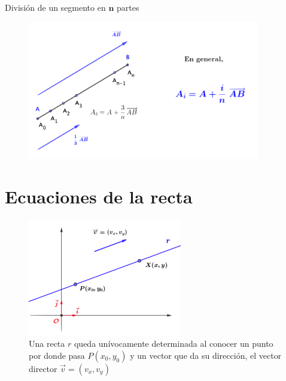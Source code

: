 \vspace{10mm}
\begin{myalertblock}{División de un segmento en $\boldsymbol n$ partes}

\begin{figure}[H]
	\centering
	\includegraphics[width=0.9\textwidth]{img-ga/ga11.png}
\end{figure}
	
\end{myalertblock}


\vspace{1cm}
\section{Ecuaciones de la recta}
\vspace{0.5cm}

\begin{figure}[H]
	\centering
	\includegraphics[width=0.6\textwidth]{img-ga/ga12.png}
	\caption*{Una recta $r$ queda unívocamente determinada al conocer un punto por donde pasa $P(x_0,y_0)$ y un vector que da su dirección, el vector director $\vec v=(v_x,v_y)$ }
\end{figure}


